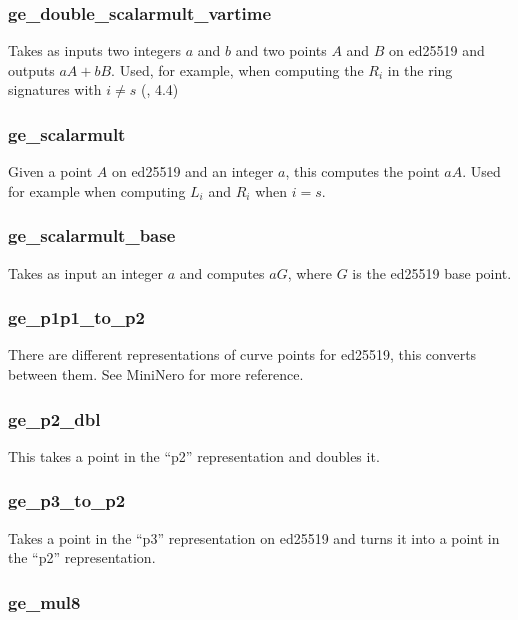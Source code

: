 \documentclass[12pt,english]{mrl}
\numberwithin{equation}{section}
\numberwithin{figure}{section}
\begin{document}
\subsubsection{ge\_double\_scalarmult\_vartime}

Takes as inputs two integers $a$ and $b$ and two points $A$ and $B$ on ed25519
and outputs $aA+bB$. Used, for example, when computing the $R_{i}$
in the ring signatures with $i\neq s$ (\cite{CN}, 4.4)


\subsubsection{ge\_scalarmult}

Given a point $A$ on ed25519 and an integer $a$, this computes
the point $aA$. Used for example when computing $L_{i}$ and $R_{i}$
when $i=s$. 


\subsubsection{ge\_scalarmult\_base}

Takes as input an integer $a$ and computes $aG$, where $G$ is the
ed25519 base point. 


\subsubsection{ge\_p1p1\_to\_p2}

There are different representations of curve points for ed25519, this
converts between them. See MiniNero for more reference. 


\subsubsection{ge\_p2\_dbl}

This takes a point in the ``p2'' representation and doubles it.


\subsubsection{ge\_p3\_to\_p2}

Takes a point in the ``p3'' representation on ed25519 and turns
it into a point in the ``p2'' representation. 


\subsubsection{ge\_mul8}
\end{document}
